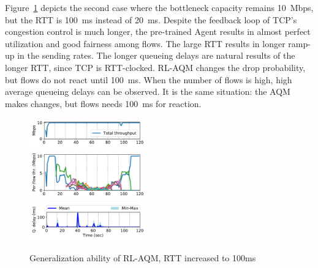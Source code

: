\documentclass[conference]{IEEEtran}
\begin{document}
Figure~\ref{fig:rl_tr10_10mbps100ms} depicts the second case where the bottleneck capacity remains 10~Mbps, but the RTT is 100~ms instead of 20~ms. Despite the feedback loop of TCP's congestion control is much longer, the pre-trained Agent results in almost perfect utilization and good fairness among flows. The large RTT results in longer ramp-up in the sending rates. The longer queueing delays are natural results of the longer RTT, since TCP is RTT-clocked. RL-AQM changes the drop probability, but flows do not react until 100~ms. When the number of flows is high, high average queueing delays can be observed. It is the same situation: the AQM makes changes, but flows needs 100~ms for reaction.

\begin{figure}[t]
\begin{center}
\includegraphics[width=0.45\textwidth]{Figures/rl_tr10mbps-10mbps_100ms_total.pdf} \\
\includegraphics[width=0.45\textwidth]{Figures/rl_tr10mbps-10mbps_100ms_flow.pdf} \\
\includegraphics[width=0.45\textwidth]{Figures/rl_tr10mbps-10mbps_100ms_delay.pdf}
\end{center}
\caption{Generalization ability of RL-AQM, RTT increased to 100ms}
\label{fig:rl_tr10_10mbps100ms}
\end{figure}

\end{document}

